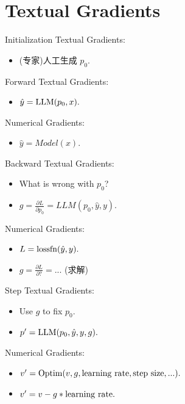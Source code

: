 \documentclass{beamer}
\begin{document}
\section{Textual Gradients}

\begin{frame}{Initialization}
    Textual Gradients:
    \begin{itemize}
        \item (专家)人工生成 $p_0.$
    \end{itemize}
\end{frame}

\begin{frame}{Forward}
    Textual Gradients:
    \begin{itemize}
        \item $\hat{y} = {\rm LLM}(p_0, x).$
    \end{itemize}
    Numerical Gradients:
    \begin{itemize}
        \item $\hat{y} = Model(x).$
    \end{itemize}
\end{frame}

\begin{frame}{Backward}
    Textual Gradients:
    \begin{itemize}
        \item What is wrong with $p_0$?
        \item $g = \frac{\partial L}{\partial p_0} = LLM(p_0, \hat{y}, y).$
    \end{itemize}
    Numerical Gradients:
    \begin{itemize}
        \item $L = {\rm lossfn}(\hat{y}, y).$
        \item $g = \frac{\partial L}{\partial ?} = ...$ (求解)
    \end{itemize}
\end{frame}

\begin{frame}{Step}
    Textual Gradients:
    \begin{itemize}
        \item Use $g$ to fix $p_0$.
        \item $p' = {\rm LLM}(p_0, \hat{y}, y, g).$
    \end{itemize}
    Numerical Gradients:
    \begin{itemize}
        \item $v' = {\rm Optim}(v, g, {\rm learning\ rate}, {\rm step\ size}, ...).$
        \item $v' = v - g * {\rm learning\ rate}.$
    \end{itemize}
\end{frame}
\end{document}

